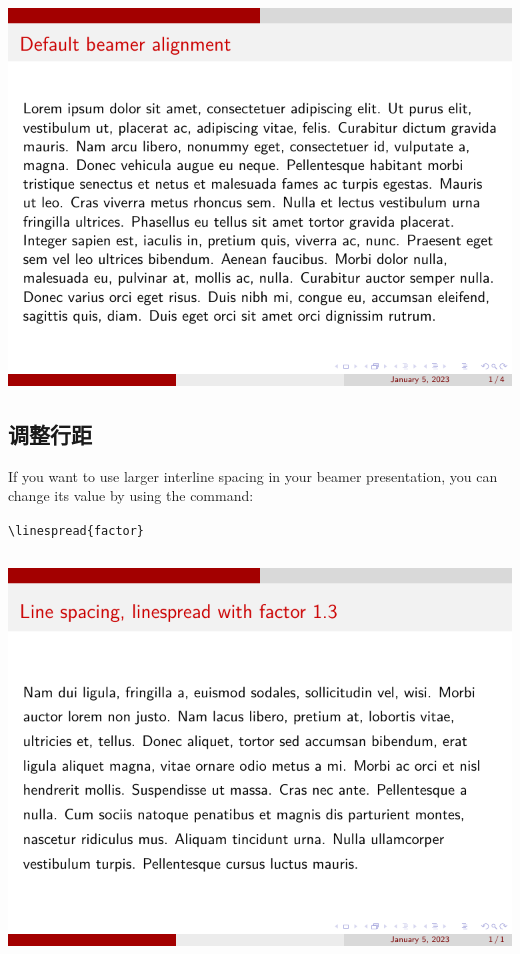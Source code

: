 \includegraphics[page=3]{examples/beamer/text-alignment.pdf}

\subsection{调整行距}

If you want to use larger interline spacing in your beamer presentation, you can change its value by using the command:

\verb|\linespread{factor}|

\inputminted[linenos=true]{latex}{examples/beamer/text-line-space.tex}

\includegraphics{examples/beamer/text-line-space.pdf}

